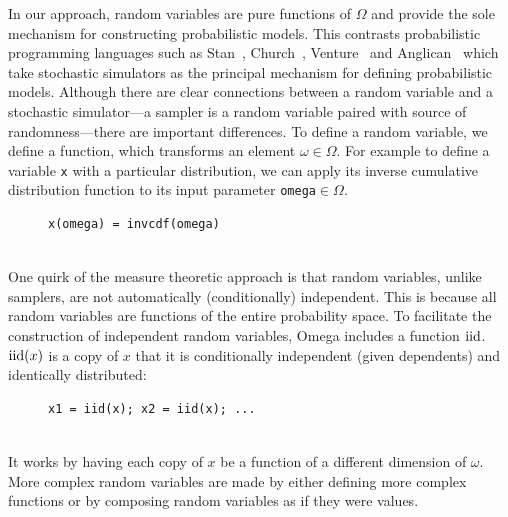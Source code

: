 In our approach, random variables are pure functions of $\Omega$ and provide 
the sole mechanism for constructing probabilistic models.
This contrasts probabilistic programming languages such as Stan~\citep{carpenter2017stan}, Church~\citep{goodman2008church}, Venture~\citep{mansinghka2014venture} and Anglican~\citep{wood2014new} which take stochastic simulators as the principal mechanism for defining probabilistic models.
Although there are clear connections between a random variable and a stochastic simulator---a sampler is a random variable paired with source of randomness---there are important differences.
To define a random variable, we define a function, which transforms an element $\omega \in \Omega$. For example to define a variable \texttt{x} with a particular distribution, we 
can apply its inverse cumulative distribution function to its input parameter \texttt{omega}$\in \Omega$.
\begin{figure}[h]
\centering
\begin{BVerbatim}
x(omega) = invcdf(omega)
\end{BVerbatim}
\end{figure}\\\textbf{}
One quirk of the measure theoretic approach is that random variables, unlike samplers, are not automatically (conditionally) independent. This is because all random variables are functions of the entire probability space.
To facilitate the construction of independent random variables,  
Omega includes a function $\operatorname{iid}$.
$\operatorname{iid}(x)$ is a copy of $x$ that it is conditionally independent (given dependents) and identically distributed:
\begin{figure}[h]
	\centering
	\begin{BVerbatim}
x1 = iid(x); x2 = iid(x); ...
	\end{BVerbatim}
\end{figure}\\
It works by having each copy of $x$ be a function of a different dimension
of $\omega$. More complex random variables are made by either defining more complex functions or by composing random variables as if they were values.


